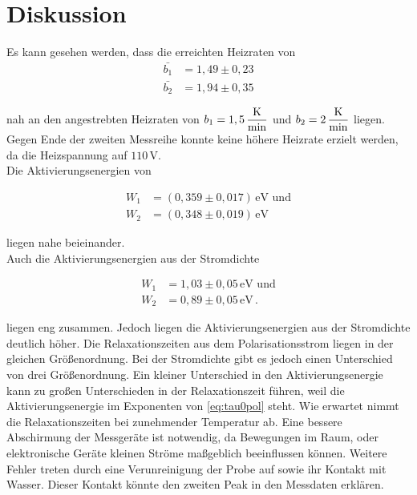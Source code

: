 \section{Diskussion}
\label{sec:Diskussion}

Es kann gesehen werden, dass die erreichten Heizraten von 
\begin{align*}
    \bar{b_1} &=   1,49 \pm  0,23 \\
    \bar{b_2} &=   1,94 \pm  0,35  
\end{align*}

nah an den angestrebten Heizraten von $ b_1 = 1,5 \, \unit{\dfrac{\kelvin}{\minute}}$ 
und $ b_2 = 2 \, \unit{\dfrac{\kelvin}{\minute}}$ liegen.
Gegen Ende der zweiten Messreihe konnte keine höhere Heizrate erzielt werden, da die Heizspannung auf $110 \,\si{\volt}$. \\
Die Aktivierungsenergien von 

\begin{align*}
W_1 &=   (0,359 \pm 0,017) \, \unit{\electronvolt} \, \, \text{und}  \\
W_2 &=   (0,348 \pm 0,019) \, \unit{\electronvolt}
\end{align*} 

liegen nahe beieinander. \\
Auch die Aktivierungsenergien aus der Stromdichte

\begin{align*}
    W_1 &= 1,03 \pm 0,05 \, \unit{\electronvolt}  \, \,  \text{und} \\
    W_2 &= 0,89 \pm 0,05 \, \unit{\electronvolt}    \,.
\end{align*}

liegen eng zusammen. Jedoch liegen die Aktivierungsenergien aus der Stromdichte deutlich höher.
Die Relaxationszeiten aus dem Polarisationsstrom liegen in der gleichen Größenordnung.
Bei der Stromdichte gibt es jedoch einen Unterschied von drei Größenordnung.
Ein kleiner Unterschied in den Aktivierungsenergie kann zu großen Unterschieden in der Relaxationszeit führen, weil 
die Aktivierungsenergie im Exponenten von \autoref{eq:tau0pol} steht.
Wie erwartet nimmt die Relaxationszeiten bei zunehmender Temperatur ab.
Eine bessere Abschirmung der Messgeräte ist notwendig, da Bewegungen im Raum, 
oder elektronische Geräte kleinen Ströme maßgeblich beeinflussen können.
Weitere Fehler treten durch eine Verunreinigung der Probe auf sowie ihr Kontakt mit Wasser.
Dieser Kontakt könnte den zweiten Peak in den Messdaten erklären.
